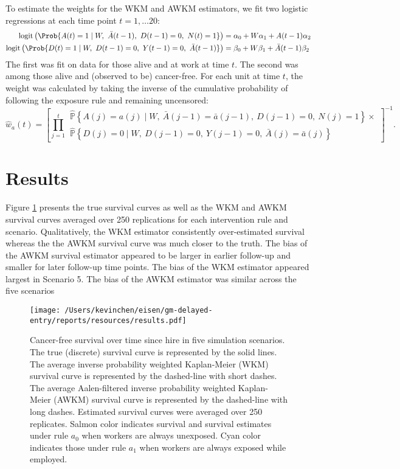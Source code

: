 \documentclass[
  11pt,
]{article}
\begin{document}
To estimate the weights for the WKM and AWKM estimators, we fit two
logistic regressions at each time point \(t = 1, \ldots 20\):
\[\begin{aligned}
\text{logit} \left(\Prob{
    A(t) = 1
    \mid W,\ \bar A(t - 1),\ D(t - 1) = 0,\ N(t) = 1
    }\right)
& = \alpha_0 + W \alpha_1 + A(t - 1) \alpha_2 \\
\text{logit} \left(\Prob{
    D(t) = 1
    \mid W,\ D(t - 1) = 0,\ Y(t - 1) = 0,\ \bar A(t - 1)}\right)
    & = \beta_0 + W \beta_1 + \bar A(t - 1) \beta_2
\end{aligned}\] The first was fit on data for those alive and at work at
time \(t\). The second was among those alive and (observed to be)
cancer-free. For each unit at time \(t\), the weight was calculated by
taking the inverse of the cumulative probability of following the
exposure rule and remaining uncensored: \[\hat w_{a} (t) =
    \left[
    \prod^t_{j = 1}
    \begin{aligned}
    \widehat {\mathbb P} \left\{
    A(j) = a(j) \mid W,\ \bar A(j - 1) = \bar a (j - 1),\ D(j - 1) = 0,\ N(j) = 1
    \right\} \times \\
    \widehat {\mathbb P} \left\{D(j) = 0
    \mid W,\ D(j - 1) = 0,\ Y(j - 1) = 0,\ \bar A(j) = \bar a (j) \right\}
    \end{aligned}\right]^{-1}.\]

\hypertarget{results}{%
\section{Results}\label{results}}

Figure \ref{fig:survival} presents the true survival curves as well as
the WKM and AWKM survival curves averaged over 250 replications for each
intervention rule and scenario. Qualitatively, the WKM estimator
consistently over-estimated survival whereas the the AWKM survival curve
was much closer to the truth. The bias of the AWKM survival estimator
appeared to be larger in earlier follow-up and smaller for later
follow-up time points. The bias of the WKM estimator appeared largest in
Scenario 5. The bias of the AWKM estimator was similar across the five
scenarios

\begin{figure}
\caption{Cancer-free survival over time since hire in five simulation scenarios. The true (discrete) survival curve is represented by the solid lines. The average inverse probability weighted Kaplan-Meier (WKM) survival curve is represented by the dashed-line with short dashes. The average Aalen-filtered inverse probability weighted Kaplan-Meier (AWKM) survival curve is represented by the dashed-line with long dashes. Estimated survival curves were averaged over 250 replicates. Salmon color indicates survival and survival estimates under rule $a_0$ when workers are always unexposed. Cyan color indicates those under rule $a_1$ when workers are always exposed while employed.}
\label{fig:survival}
\begin{center}
\texttt{[image: /Users/kevinchen/eisen/gm-delayed-entry/reports/resources/results.pdf]}
\end{center}
\end{figure}
\end{document}
